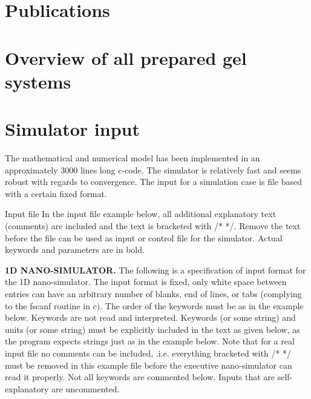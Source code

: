 \begin{appendices}
\chapter{Publications}
\clearpage
{}
\clearpage
{}
\clearpage
{}

\chapter{Overview of all prepared gel systems}


\chapter{Simulator input}
\lstset{language=C}

The mathematical and numerical model has been implemented in an approximately 3000 lines long c-code. The simulator is relatively fast and seems robust with regards to convergence. The input for a simulation case is file based with a certain fixed format. 

Input file
In the input file example below, all additional explanatory text (comments) are included and the text is bracketed with /*    */. Remove the text before the file can be used as input or control file for the simulator. Actual keywords and parameters are in bold.
 

\textbf{1D NANO-SIMULATOR.}
The following is a specification of input format for the 1D nano-simulator.
The input format is fixed, only white space between entries can have an arbitrary number of blanks, end of lines, or tabs (complying to the fscanf routine in c). The order of the keywords must be as in the example below. Keywords are not read and interpreted.
Keywords (or some string) and units (or some string) must be explicitly included in the text as given below, as the program expects strings just as in the example below.
Note that for a real input file no comments can be included, .i.e. everything bracketed with /*  */ must be removed in this example file before the executive nano-simulator can read it properly. 
Not all keywords are commented below. Inputs that are self-explanatory are uncommented.
 


\end{appendices}
